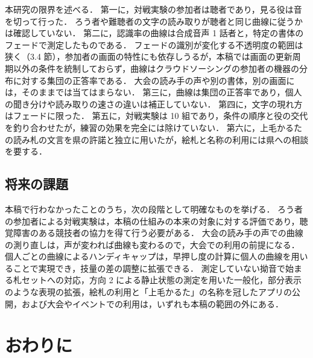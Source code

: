 本研究の限界を述べる．
第一に，対戦実験の参加者は聴者であり，見る役は音を切って行った．
ろう者や難聴者の文字の読み取りが聴者と同じ曲線に従うかは確認していない．
第二に，認識率の曲線は合成音声 1 話者と，特定の書体のフェードで測定したものである．
フェードの識別が変化する不透明度の範囲は狭く（3.4 節），参加者の画面の特性にも依存しうるが，本稿では画面の更新周期以外の条件を統制しておらず，曲線はクラウドソーシングの参加者の機器の分布に対する集団の正答率である．
大会の読み手の声や別の書体，別の画面には，そのままでは当てはまらない．
第三に，曲線は集団の正答率であり，個人の聞き分けや読み取りの速さの違いは補正していない．
第四に，文字の現れ方はフェードに限った．
第五に，対戦実験は 10 組であり，条件の順序と役の交代を釣り合わせたが，練習の効果を完全には除けていない．
第六に，上毛かるたの読み札の文言を県の許諾と独立に用いたが，絵札と名称の利用には県への相談を要する．

\subsection{将来の課題}

本稿で行わなかったことのうち，次の段階として明確なものを挙げる．
ろう者の参加者による対戦実験は，本稿の仕組みの本来の対象に対する評価であり，聴覚障害のある競技者の協力を得て行う必要がある．
大会の読み手の声での曲線の測り直しは，声が変われば曲線も変わるので，大会での利用の前提になる．
個人ごとの曲線によるハンディキャップは，早押し度の計算に個人の曲線を用いることで実現でき，技量の差の調整に拡張できる．
測定していない拗音で始まる札セットへの対応，方向 2 による静止状態の測定を用いた一般化，部分表示のような表現の拡張，絵札の利用と「上毛かるた」の名称を冠したアプリの公開，および大会やイベントでの利用は，いずれも本稿の範囲の外にある．

\section{おわりに}

